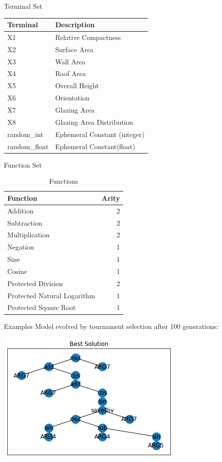 \documentclass[
  ignorenonframetext,
]{beamer}
\begin{document}
\begin{frame}{Terminal Set}
\protect\hypertarget{terminal-set}{}
\begin{tabular}{l|l}
\hline
Terminal & Description\\
\hline
X1 & Relative Compactness\\
\hline
X2 & Surface Area\\
\hline
X3 & Wall Area\\
\hline
X4 & Roof Area\\
\hline
X5 & Overall Height\\
\hline
X6 & Orientation\\
\hline
X7 & Glazing Area\\
\hline
X8 & Glazing Area Distribution\\
\hline
random\_int & Ephemeral Constant (integer)\\
\hline
random\_float & Ephemeral Constant(float)\\
\hline
\end{tabular}
\end{frame}

\begin{frame}{Function Set}
\protect\hypertarget{function-set}{}
\begin{table}

\caption{\label{tab:unnamed-chunk-4}Functions}
\centering
\begin{tabular}[t]{l|r}
\hline
Function & Arity\\
\hline
Addition & 2\\
\hline
Subtraction & 2\\
\hline
Multiplication & 2\\
\hline
Negation & 1\\
\hline
Sine & 1\\
\hline
Cosine & 1\\
\hline
Protected Division & 2\\
\hline
Protected Natural Logarithm & 1\\
\hline
Protected Square Root & 1\\
\hline
\end{tabular}
\end{table}
\end{frame}

\begin{frame}{Examples}
\protect\hypertarget{examples}{}
Model evolved by tournament selection after 100 generations:

\includegraphics{../plots/example_model.png}
\end{frame}
\end{document}
